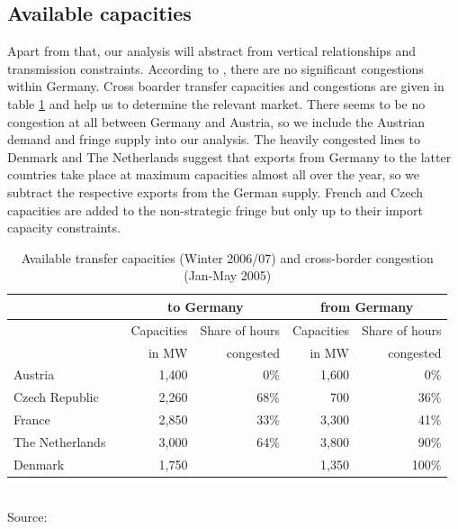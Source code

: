 \subsection{Available capacities}
\label{sec:available-capacities}

Apart from that, our analysis will abstract from vertical relationships and transmission constraints. According to \cite{IEA2007a}, there are no significant congestions within Germany. Cross boarder transfer capacities and congestions are given in table \ref{tab:transfer} and help us to determine the relevant market. There seems to be no congestion at all between Germany and Austria, so we include the Austrian demand and fringe supply into our analysis. The heavily congested lines to Denmark and The Netherlands suggest that exports from Germany to the latter countries take place at maximum capacities almost all over the year, so we subtract the respective exports from the German supply. French and Czech capacities are added to the non-strategic fringe but only up to their import capacity constraints.

\begin{table}[htb]
\centering
\small
\caption{Available transfer capacities (Winter 2006/07) and cross-border congestion (Jan-May 2005)}
\vspace{0.3cm}
\begin{tabular}{lrrrrr}
\hline
           &            & \multicolumn{ 2}{c}{to Germany} & \multicolumn{ 2}{c}{from Germany} \\
\hline
           &            & Capacities  & Share of hours  & Capacities & Share of hours  \\

           &            & in MW        &  congested & in MW           &  congested \\
\hline
\hline
   Austria &            &       1,400 &        0\% &       1,600 &        0\% \\

Czech Republic &            &       2,260 &       68\% &        700 &       36\% \\

    France &            &       2,850 &       33\% &       3,300 &       41\% \\

The Netherlands &            &       3,000 &       64\% &       3,800 &       90\% \\

   Denmark &            &       1,750 &            &       1,350 &      100\% \\

\hline
\end{tabular}  
\label{tab:transfer}
\\
\vspace{0.3cm}
\scriptsize Source: \cite{IEA2007a}
\end{table}

